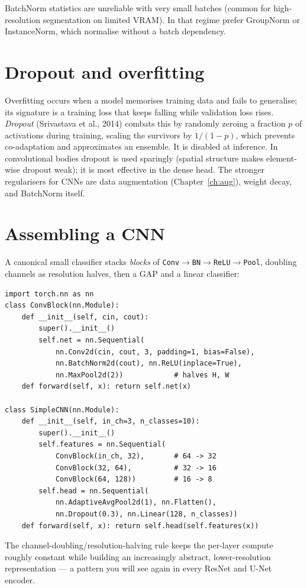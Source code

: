 \begin{notebox}
BatchNorm statistics are unreliable with very small batches (common for
high-resolution segmentation on limited VRAM). In that regime prefer GroupNorm
or InstanceNorm, which normalise without a batch dependency.
\end{notebox}

\section{Dropout and overfitting}

Overfitting occurs when a model memorises training data and fails to generalise;
its signature is a training loss that keeps falling while validation loss rises.
\emph{Dropout} (Srivastava et al., 2014) combats this by randomly zeroing a
fraction $p$ of activations during training, scaling the survivors by
$1/(1-p)$, which prevents co-adaptation and approximates an ensemble. It is
disabled at inference. In convolutional bodies dropout is used sparingly
(spatial structure makes element-wise dropout weak); it is most effective in
the dense head. The stronger regularisers for CNNs are data augmentation
(Chapter~\ref{ch:aug}), weight decay, and BatchNorm itself.

\section{Assembling a CNN}

A canonical small classifier stacks \emph{blocks} of
\texttt{Conv$\to$BN$\to$ReLU$\to$Pool}, doubling channels as resolution halves,
then a GAP and a linear classifier:
\begin{lstlisting}
import torch.nn as nn
class ConvBlock(nn.Module):
    def __init__(self, cin, cout):
        super().__init__()
        self.net = nn.Sequential(
            nn.Conv2d(cin, cout, 3, padding=1, bias=False),
            nn.BatchNorm2d(cout), nn.ReLU(inplace=True),
            nn.MaxPool2d(2))            # halves H, W
    def forward(self, x): return self.net(x)

class SimpleCNN(nn.Module):
    def __init__(self, in_ch=3, n_classes=10):
        super().__init__()
        self.features = nn.Sequential(
            ConvBlock(in_ch, 32),       # 64 -> 32
            ConvBlock(32, 64),          # 32 -> 16
            ConvBlock(64, 128))         # 16 -> 8
        self.head = nn.Sequential(
            nn.AdaptiveAvgPool2d(1), nn.Flatten(),
            nn.Dropout(0.3), nn.Linear(128, n_classes))
    def forward(self, x): return self.head(self.features(x))
\end{lstlisting}
The channel-doubling/resolution-halving rule keeps the per-layer compute roughly
constant while building an increasingly abstract, lower-resolution
representation --- a pattern you will see again in every ResNet and U-Net
encoder.

